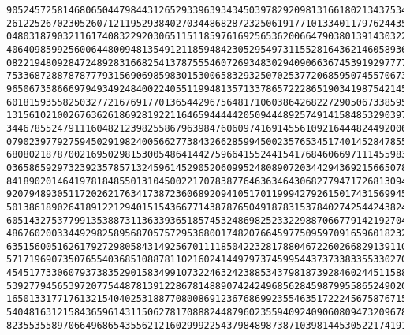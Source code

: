 \documentclass[11pt]{llncs}
\begin{document}
\begin{subappendices}
{\begin{verbatim}
9052457258146806504479844312652933963934345039782920981316618021343753492261904833585652640510839540488804\
2612252670230526071211952938402703448682872325061917710133401179762443544506255485207598674924919709543956\
0480318790321161740832292030651151185976169256536200664790380139143032263888546981729200401142632103111392\
4064098599256006448009481354912118594842305295497311552816436214605893674831740404346654366643331475581457\
0822194809284724892831668254137875554607269348302940906636745391929777748817519335123765508977700051204383\
7533687288787877793156906985983015300658329325070253772068595074557067328255774593601995026745153779206686\
9650673586669794934924840022405511994813571337865722286519034198754214510515702993605481375015502086300325\
6018159355825032772167691770136544296756481710603864268227290506733859544325189994664233703918695556790811\
1315610210026763626186928192211646594444420509444892574914158485329039723865366746184767175008863773048656\
3446785524791116048212398255867963984760609741691455610921644482449200626753586774752932974017167339582031\
0790239779275945029198240056627738432662859945002357653451740145284785560911363996991203626319546870871705\
6808021878700216950298153005486414427596641552441541768460669711145598361205051763664490759041169284429599\
0365865929732392357857132459614529052060995248089072034429436921566507819543803237192871948024141916518736\
8418902014641978184855013104500221707838776463634643068277947172681309403115147907824510756707893774449421\
9207948930511720262176341738723606892094105170119994279261501743156994561213126256648627608227947223213849\
5013861890264189122129401515436677143878765049187831537840274254424382439643469154213721491144269067296361\
6051432753779913538873113633936518574532486982523322988706677914219270407026556650524538565864371064774748\
4867602003344929825895687057572953680017482076645977509597091659601823250525835336256115596721455871414374\
6351560051626179272980584314925670111185042232817880467226026682913911023733784867852189640489302773537683\
5717196907350765540368510887811021602414497973745995443737338335533027023950567389671881860493290854194750\
4545177330607937383529015834991073224632423885343798187392846024451158898698310032950777455747923800905182\
5392779456539720775448781391228678148890742424968562845987995586524902058280079962717162582155370835454789\
1650133177176132154040253188770800869123676869923554635172224567587671587185280855086810932854774829377859\
5404816312158436596143115062781708882448796023559409240906080947320967881759405195787139063876234354405964\
8235535589706649686543556212160299922543798489873871039814453052217419176811991881558223042302400904599466\

\end{verbatim}}
\end{subappendices}
\end{document}
